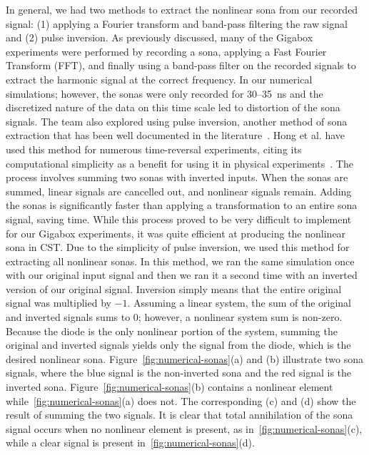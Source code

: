 In general, we had two methods to extract the nonlinear sona from our recorded signal: (1) applying a Fourier transform and band-pass filtering the raw signal and (2) pulse inversion. As previously discussed, many of the Gigabox experiments were performed by recording a sona, applying a Fast Fourier Transform (FFT), and finally using a band-pass filter on the recorded signals to extract the harmonic signal at the correct frequency. In our numerical simulations; however, the sonas were only recorded for \numrange{30}{35}~ns and the discretized nature of the data on this time scale led to distortion of the sona signals.
The team also explored using pulse inversion, another method of sona extraction that has been well documented in the literature~\cite{simpson_pulse_1999,hong_nonlinear_2014}. Hong et al. have used this method for numerous time-reversal experiments, citing its computational simplicity as a benefit for using it in physical experiments~\cite{hong_nonlinear_2014}. The process involves summing two sonas with inverted inputs.  When the sonas are summed, linear signals are cancelled out, and nonlinear signals remain. Adding the sonas is significantly faster than applying a transformation to an entire sona signal, saving time. While this process proved to be very difficult to implement for our Gigabox experiments, it was quite efficient at producing the nonlinear sona in CST.
Due to the simplicity of pulse inversion, we used this method for extracting all nonlinear sonas. In this method, we ran the same simulation once with our original input signal and then we ran it a second time with an inverted version of our original signal. Inversion simply means that the entire original signal was multiplied by $-1$. Assuming a linear system, the sum of the original and inverted signals sums to $0$; however, a nonlinear system sum is non-zero. Because the diode is the only nonlinear portion of the system, summing the original and inverted signals yields only the signal from the diode, which is the desired nonlinear sona. Figure~\ref{fig:numerical-sonas}(a) and (b) illustrate two sona signals, where the blue signal is the non-inverted sona and the red signal is the inverted sona. Figure~\ref{fig:numerical-sonas}(b) contains a nonlinear element while~\ref{fig:numerical-sonas}(a) does not. The corresponding (c) and (d) show the result of summing the two signals. It is clear that total annihilation of the sona signal occurs when no nonlinear element is present, as in~\ref{fig:numerical-sonas}(c), while a clear signal is present in~\ref{fig:numerical-sonas}(d).


